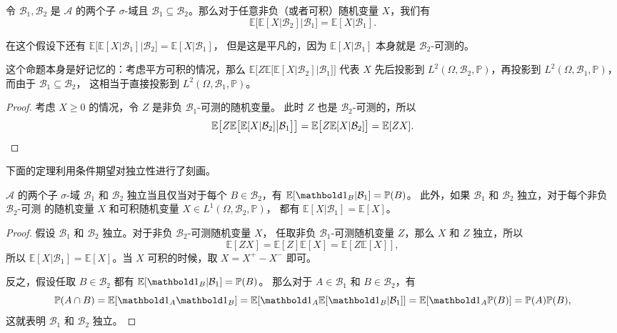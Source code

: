 \begin{proposition}[嵌套 $\sigma$-域]\label{prop:nested sigma field}
  令 $\mathcal{B}_1,\mathcal{B}_2$ 是 $\mathcal{A}$ 的两个子 $\sigma$-域且
  $\mathcal{B}_1\subseteq \mathcal{B}_2$。那么对于任意非负（或者可积）随机变量 $X$，我们有
  \[
    \mathbb{E}\bigl[\mathbb{E}[X|\mathcal{B}_2]\big| \mathcal{B}_1\bigr]=
    \mathbb{E}[X|\mathcal{B}_1].
  \]
\end{proposition}
\begin{remark}
  在这个假设下还有 $\mathbb{E}\bigl[\mathbb{E}[X|\mathcal{B}_1]\big| \mathcal{B}_2\bigr]=\mathbb{E}[X|\mathcal{B}_1]$，
  但是这是平凡的，因为 $\mathbb{E}[X|\mathcal{B}_1]$ 本身就是 $\mathcal{B}_2$-可测的。
\end{remark}
\begin{remark}
  这个命题本身是好记忆的：考虑平方可积的情况，那么 
  $\mathbb{E}\bigl[
      Z\mathbb{E}\bigl[\mathbb{E}[X|\mathcal{B}_2]\big| \mathcal{B}_1\bigr]
    \bigr]$ 
  代表 $X$ 先后投影到 $L^2(\Omega,\mathcal{B}_2,\mathbb{P})$，再投影到
  $L^2(\Omega,\mathcal{B}_1,\mathbb{P})$，而由于 $\mathcal{B}_1\subseteq \mathcal{B}_2$，
  这相当于直接投影到 $L^2(\Omega,\mathcal{B}_1,\mathbb{P})$。
\end{remark}
\begin{proof}
  考虑 $X\geq 0$ 的情况，令 $Z$ 是非负 $\mathcal{B}_1$-可测的随机变量。
  此时 $Z$ 也是 $\mathcal{B}_2$-可测的，所以
  \[
    \mathbb{E}\bigl[
      Z\mathbb{E}\bigl[\mathbb{E}[X|\mathcal{B}_2]\big| \mathcal{B}_1\bigr]
    \bigr]=\mathbb{E}\bigl[
      Z \mathbb{E}[X|\mathcal{B}_2]
    \bigr]=\mathbb{E}[ZX].\qedhere
  \]
\end{proof}

下面的定理利用条件期望对独立性进行了刻画。

\begin{theorem}
  $\mathcal{A}$ 的两个子 $\sigma$-域 $\mathcal{B}_1$ 和 $\mathcal{B}_2$
  独立当且仅当对于每个 $B\in \mathcal{B}_2$，有 $\mathbb{E}[\idf_{B}|\mathcal{B}_1]=\mathbb{P}(B)$。
  此外，如果 $\mathcal{B}_1$ 和 $\mathcal{B}_2$ 独立，对于每个非负 $\mathcal{B}_2$-可测
  的随机变量 $X$ 和可积随机变量 $X\in L^1(\Omega,\mathcal{B}_2,\mathbb{P})$，
  都有 $\mathbb{E}[X|\mathcal{B}_1]=\mathbb{E}[X]$。
\end{theorem}
\begin{proof}
  假设 $\mathcal{B}_1$ 和 $\mathcal{B}_2$ 独立。对于非负 $\mathcal{B}_2$-可测随机变量 $X$，
  任取非负 $\mathcal{B}_1$-可测随机变量 $Z$，那么 $X$ 和 $Z$ 独立，所以
  \[
    \mathbb{E}[ZX]=\mathbb{E}[Z]\mathbb{E}[X]=\mathbb{E}[Z\mathbb{E}[X]],
  \]
  所以 $\mathbb{E}[X|\mathcal{B}_1]=\mathbb{E}[X]$。当 $X$ 可积的时候，取 $X=X^+-X^-$ 即可。

  反之，假设任取 $B\in \mathcal{B}_2$ 都有 $\mathbb{E}[\idf_{B}|\mathcal{B}_1]=\mathbb{P}(B)$。
  那么对于 $A\in \mathcal{B}_1$ 和 $B\in \mathcal{B}_2$，有
  \[
    \mathbb{P}(A\cap B)=\mathbb{E}[\idf_{A}\idf_B]=
    \mathbb{E}[\idf_{A}\mathbb{E}[\idf_B|\mathcal{B}_1]]=
    \mathbb{E}[\idf_{A}\mathbb{P}(B)]=\mathbb{P}(A)\mathbb{P}(B),
  \]
  这就表明 $\mathcal{B}_1$ 和 $\mathcal{B}_2$ 独立。
\end{proof}


